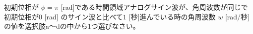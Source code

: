 初期位相が $\phi=\pi$ [rad]である時間領域アナログサイン波が、角周波数が同じで初期位相が$0$ [rad] のサイン波と比べて$1$ [秒]進んでいる時の角周波数 $w$ [rad/秒]の値を選択肢a〜dの中から1つ選びなさい。
